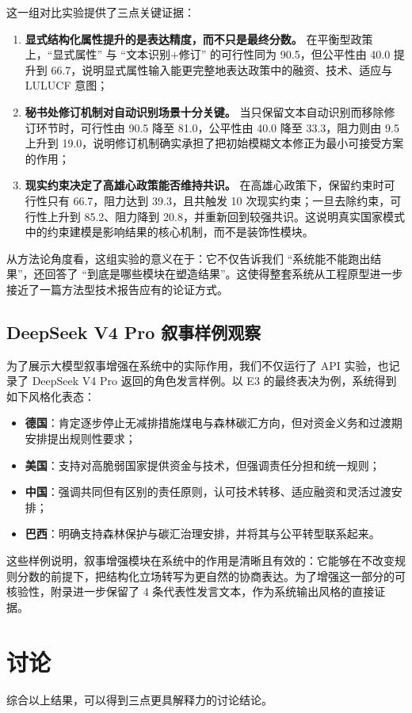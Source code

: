 \documentclass[12pt,a4paper]{ctexart}
\begin{document}
这一组对比实验提供了三点关键证据：
\begin{enumerate}
  \item \textbf{显式结构化属性提升的是表达精度，而不只是最终分数。} 在平衡型政策上，``显式属性'' 与 ``文本识别+修订'' 的可行性同为 90.5，但公平性由 40.0 提升到 66.7，说明显式属性输入能更完整地表达政策中的融资、技术、适应与 LULUCF 意图；
  \item \textbf{秘书处修订机制对自动识别场景十分关键。} 当只保留文本自动识别而移除修订环节时，可行性由 90.5 降至 81.0，公平性由 40.0 降至 33.3，阻力则由 9.5 上升到 19.0，说明修订机制确实承担了把初始模糊文本修正为最小可接受方案的作用；
  \item \textbf{现实约束决定了高雄心政策能否维持共识。} 在高雄心政策下，保留约束时可行性只有 66.7，阻力达到 39.3，且共触发 10 次现实约束；一旦去除约束，可行性上升到 85.2、阻力降到 20.8，并重新回到较强共识。这说明真实国家模式中的约束建模是影响结果的核心机制，而不是装饰性模块。
\end{enumerate}

从方法论角度看，这组实验的意义在于：它不仅告诉我们 ``系统能不能跑出结果''，还回答了 ``到底是哪些模块在塑造结果''。这使得整套系统从工程原型进一步接近了一篇方法型技术报告应有的论证方式。

\subsection{DeepSeek V4 Pro 叙事样例观察}
为了展示大模型叙事增强在系统中的实际作用，我们不仅运行了 API 实验，也记录了 DeepSeek V4 Pro 返回的角色发言样例。以 E3 的最终表决为例，系统得到如下风格化表态：
\begin{itemize}
  \item \textbf{德国}：肯定逐步停止无减排措施煤电与森林碳汇方向，但对资金义务和过渡期安排提出规则性要求；
  \item \textbf{美国}：支持对高脆弱国家提供资金与技术，但强调责任分担和统一规则；
  \item \textbf{中国}：强调共同但有区别的责任原则，认可技术转移、适应融资和灵活过渡安排；
  \item \textbf{巴西}：明确支持森林保护与碳汇治理安排，并将其与公平转型联系起来。
\end{itemize}

这些样例说明，叙事增强模块在系统中的作用是清晰且有效的：它能够在不改变规则分数的前提下，把结构化立场转写为更自然的协商表达。为了增强这一部分的可核验性，附录进一步保留了 4 条代表性发言文本，作为系统输出风格的直接证据。

\section{讨论}
综合以上结果，可以得到三点更具解释力的讨论结论。
\end{document}
